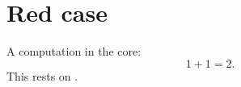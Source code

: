 \chapter{Red case}\label{c99}

A computation in the core:
\begin{equation}\label{c99.eq.eins}
  1 + 1 = 2.
\end{equation}
This rests on .
